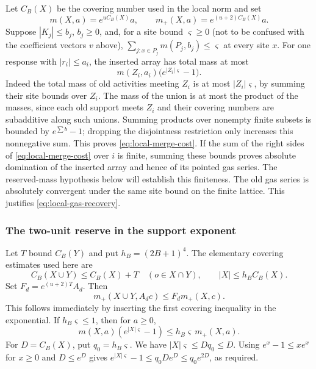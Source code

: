 Let $C_B(X)$ be the covering number used in the local norm and set
\[
       m(X,a)=e^{uC_B(X)}a,\qquad
       m_+(X,a)=e^{(u+2)C_B(X)}a.
\]
Suppose $|K_j|\le b_j$, $b_j\ge0$, and, for a site bound $\varsigma\ge0$
(not to be confused with the coefficient vectors $v$ above),
$\sum_{j:x\in P_j}m(P_j,b_j)\le\varsigma$ at every site $x$.
For one response with $|r_i|\le a_i$, the inserted array has total
mass at most
\begin{equation}\label{eq:local-merge-cost}
           m(Z_i,a_i)\bigl(e^{|Z_i|\varsigma}-1\bigr).
\end{equation}
Indeed the total mass of old activities meeting $Z_i$ is at most
$|Z_i|\varsigma$, by summing their site bounds over $Z_i$.
The mass of the union is at most the product of the masses, since
each old support meets $Z_i$ and their covering numbers are
subadditive along such unions. Summing products over nonempty
finite subsets is bounded by $e^{\sum b}-1$; dropping the
disjointness restriction only increases this nonnegative sum.
This proves \eqref{eq:local-merge-cost}. If the sum of the right sides of \eqref{eq:local-merge-cost}
over $i$ is finite, summing these bounds proves absolute domination
of the inserted array and hence of its pointed gas series.
The reserved-mass hypothesis below will establish this finiteness. The old gas series is absolutely convergent
under the same site bound on the finite lattice. This justifies
\eqref{eq:local-gas-recovery}.

\subsubsection{The two-unit reserve in the support exponent}
Let $T$ bound $C_B(Y)$ and put $h_B=(2B+1)^4$.
The elementary covering estimates used here are
\[
 C_B(X\cup Y)\le C_B(X)+T\quad(o\in X\cap Y),
       \qquad |X|\le h_B C_B(X).
\]
Set $F_d=e^{(u+2)T}A_d$. Then
\begin{equation}\label{eq:local-join-price}
               m_+(X\cup Y,A_dc)\le F_d m_+(X,c).
\end{equation}
This follows immediately by inserting the first covering inequality
in the exponential. If $h_B\varsigma\le1$, then for $a\ge0$,
\begin{equation}\label{eq:local-meeting-reserve}
       m(X,a)(e^{|X|\varsigma}-1)\le h_B\varsigma\,m_+(X,a).
\end{equation}
For $D=C_B(X)$, put $q_0=h_B\varsigma$. We have $|X|\varsigma\le Dq_0\le D$.
Using $e^x-1\le xe^x$ for $x\ge0$ and $D\le e^D$ gives
$e^{|X|\varsigma}-1\le q_0De^D\le q_0e^{2D}$, as required.


